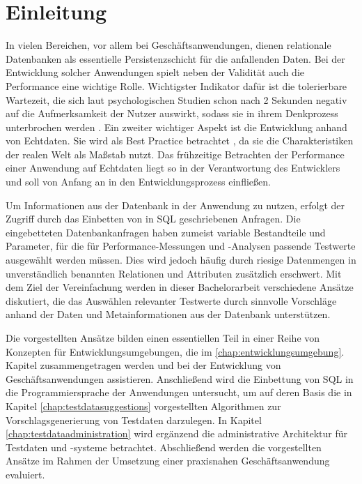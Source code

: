 \section{Einleitung}\label{chap:introduction}

%
%

In vielen Bereichen, vor allem bei Geschäftsanwendungen, dienen relationale Datenbanken als essentielle Persistenzschicht für die anfallenden Daten.
Bei der Entwicklung solcher Anwendungen spielt neben der Validität auch die Performance eine wichtige Rolle.
Wichtigster Indikator dafür ist die tolerierbare Wartezeit, die sich laut psychologischen Studien schon nach 2 Sekunden negativ auf die Aufmerksamkeit der Nutzer auswirkt, sodass sie in ihrem Denkprozess unterbrochen werden \cite{Nah04}.
Ein zweiter wichtiger Aspekt ist die Entwicklung anhand von Echtdaten.
Sie wird als Best Practice betrachtet \cite[S. 212]{Plattner:2013:CID:2490529}, da sie die Charakteristiken der realen Welt als Maßstab nutzt.
Das frühzeitige Betrachten der Performance einer Anwendung auf Echtdaten liegt so in der Verantwortung des Entwicklers und soll von Anfang an in den Entwicklungsprozess einfließen.

Um Informationen aus der Datenbank in der Anwendung zu nutzen, erfolgt der Zugriff durch das Einbetten von in SQL geschriebenen Anfragen.
Die eingebetteten Datenbankanfragen haben zumeist variable Bestandteile und Parameter, für die für Performance-Messungen und -Analysen passende Testwerte ausgewählt werden müssen.
Dies wird jedoch häufig durch riesige Datenmengen in unverständlich benannten Relationen und Attributen zusätzlich erschwert.
Mit dem Ziel der Vereinfachung werden in dieser Bachelorarbeit verschiedene Ansätze diskutiert, die das Auswählen relevanter Testwerte durch sinnvolle Vorschläge anhand der Daten und Metainformationen aus der Datenbank unterstützen.

Die vorgestellten Ansätze bilden einen essentiellen Teil in einer Reihe von Konzepten für Entwicklungsumgebungen, die im \ref{chap:entwicklungsumgebung}. Kapitel zusammengetragen werden und bei der Entwicklung von Geschäftsanwendungen assistieren.
Anschließend wird die Einbettung von SQL in die Programmiersprache der Anwendungen untersucht, um auf deren Basis die in Kapitel \ref{chap:testdatasuggestions} vorgestellten Algorithmen zur Vorschlagsgenerierung von Testdaten darzulegen.
In Kapitel \ref{chap:testdataadministration} wird ergänzend die administrative Architektur für Testdaten und -systeme betrachtet.
Abschließend werden die vorgestellten Ansätze im Rahmen der Umsetzung einer praxisnahen Geschäftsanwendung evaluiert.